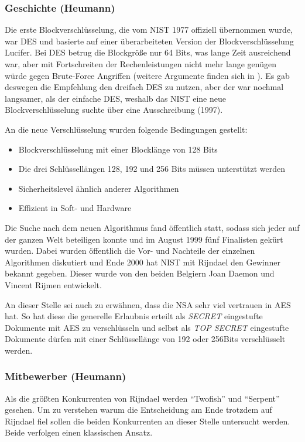  \subsubsection{Geschichte (Heumann)}
 \label{aes-geschichte}
 Die erste Blockverschlüsselung, die vom \ac{NIST} 1977 offiziell übernommen wurde, war
 \ac{DES} und basierte auf einer überarbeiteten Version der Blockverschlüsselung Lucifer. Bei
 DES betrug die Blockgröße nur 64 Bits, was lange Zeit ausreichend war, aber mit Fortschreiten
 der Rechenleistungen nicht mehr lange genügen würde gegen Brute-Force Angriffen (weitere
 Argumente finden sich in \cite{paar10}). Es gab deswegen die Empfehlung den dreifach DES zu
 nutzen, aber der war nochmal langsamer, als der einfache DES, weshalb das NIST eine neue
 Blockverschlüsselung suchte über eine Ausschreibung (1997).
 
 An die neue Verschlüsselung wurden folgende Bedingungen gestellt:
\begin{itemize}
 \item Blockverschlüsselung mit einer Blocklänge von 128 Bits
 \item Die drei Schlüssellängen 128, 192 und 256 Bits müssen unterstützt werden
 \item Sicherheitslevel ähnlich anderer Algorithmen
 \item Effizient in Soft- und Hardware
\end{itemize} 

Die Suche nach dem neuen Algorithmus fand öffentlich statt, sodass sich jeder auf der ganzen
Welt beteiligen konnte und im August 1999 fünf Finalisten gekürt wurden. Dabei wurden
öffentlich die Vor- und Nachteile der einzelnen Algorithmen diskutiert und Ende 2000 hat NIST
mit Rijndael den Gewinner bekannt gegeben. Dieser wurde von den beiden Belgiern Joan
Daemon und Vincent Rijmen entwickelt.

An dieser Stelle sei auch zu erwähnen, dass die \ac{NSA} sehr viel vertrauen in AES hat. So hat
diese die generelle Erlaubnis erteilt als \emph{SECRET} eingestufte Dokumente mit AES zu
verschlüsseln und selbst als \emph{TOP SECRET} eingestufte Dokumente dürfen mit einer
Schlüssellänge von 192 oder 256Bits verschlüsselt werden. \cite{paar10}
 
 \subsubsection{Mitbewerber (Heumann)}
 Als die größten Konkurrenten von Rijndael werden ``Twofish'' und ``Serpent'' gesehen. Um zu verstehen
 warum die Entscheidung am Ende trotzdem auf Rijndael fiel sollen die beiden Konkurrenten an dieser
 Stelle untersucht werden. Beide verfolgen einen klassischen Ansatz.
 
